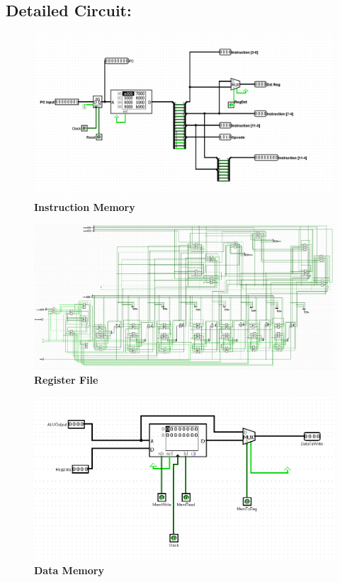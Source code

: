 \documentclass{article}
\begin{document}
\subsection{Detailed Circuit: }
    \begin{figure}[!h]
        \centering
        \includegraphics[scale = 0.45]{Images/Instruction Memory.png}
        \caption{\textbf{Instruction Memory}}
    \end{figure}

\begin{figure}[t]
    \centering
    \includegraphics[scale = 0.4]{Images/Register File.png}
    \caption{\textbf{Register File}}
\end{figure}

\begin{figure}[!h]
    \centering
    \includegraphics[scale = 0.75]{Images/Data Memory.png}
    \caption{\textbf{Data Memory}}
\end{figure}
\end{document}
